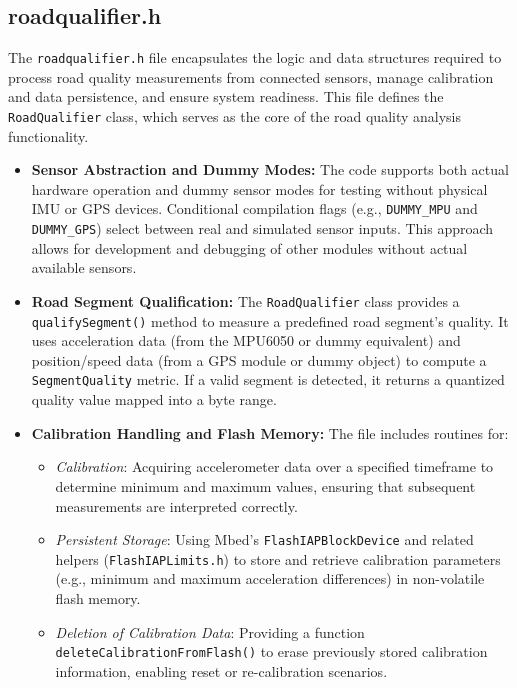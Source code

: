 \subsection{roadqualifier.h}

The \texttt{roadqualifier.h} file encapsulates the logic and data structures required to process road quality measurements from connected sensors, manage calibration and data persistence, and ensure system readiness. This file defines the \texttt{RoadQualifier} class, which serves as the core of the road quality analysis functionality.

\begin{itemize}
    \item \textbf{Sensor Abstraction and Dummy Modes:}  
    The code supports both actual hardware operation and dummy sensor modes for testing without physical IMU or GPS devices. Conditional compilation flags (e.g., \texttt{DUMMY\_MPU} and \texttt{DUMMY\_GPS}) select between real and simulated sensor inputs. This approach allows for development and debugging of other modules without actual available sensors.

    \item \textbf{Road Segment Qualification:}  
    The \texttt{RoadQualifier} class provides a \texttt{qualifySegment()} method to measure a predefined road segment’s quality. It uses acceleration data (from the MPU6050 or dummy equivalent) and position/speed data (from a GPS module or dummy object) to compute a \texttt{SegmentQuality} metric. If a valid segment is detected, it returns a quantized quality value mapped into a byte range.

    \item \textbf{Calibration Handling and Flash Memory:}  
    The file includes routines for:
    \begin{itemize}
        \item \textit{Calibration}: Acquiring accelerometer data over a specified timeframe to determine minimum and maximum values, ensuring that subsequent measurements are interpreted correctly.
        \item \textit{Persistent Storage}: Using Mbed’s \texttt{FlashIAPBlockDevice} and related helpers (\texttt{FlashIAPLimits.h}) to store and retrieve calibration parameters (e.g., minimum and maximum acceleration differences) in non-volatile flash memory.
        \item \textit{Deletion of Calibration Data}: Providing a function \texttt{deleteCalibrationFromFlash()} to erase previously stored calibration information, enabling reset or re-calibration scenarios.
    \end{itemize}


\end{itemize}
